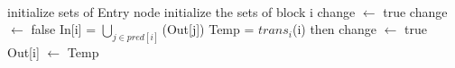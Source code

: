{\tt
  \begin{program}{0}
   initialize sets of Entry node
   
   initialize the sets of block i
   change $\leftarrow$ true
   
   change $\leftarrow$ false
   
   In[i] = $\bigcup_{j\in{pred[i]}}$(Out[j])
   Temp = $trans_i$(i)
    then 
   change $\leftarrow$ true
   Out[i] $\leftarrow$ Temp
  \end{program}
}